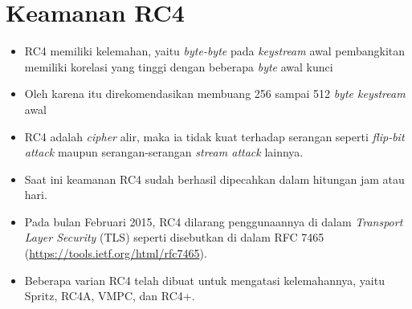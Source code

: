 \documentclass{article}
\begin{document}

\section*{Keamanan RC4}

\begin{itemize}
    \item RC4 memiliki kelemahan, yaitu \textit{byte-byte} pada \textit{keystream} awal pembangkitan memiliki korelasi yang tinggi dengan beberapa \textit{byte} awal kunci
    \item Oleh karena itu direkomendasikan membuang 256 sampai 512 \textit{byte keystream} awal
    \item RC4 adalah \textit{cipher} alir, maka ia tidak kuat terhadap serangan seperti \textit{flip-bit attack} maupun serangan-serangan \textit{stream attack} lainnya.
    \item Saat ini keamanan RC4 sudah berhasil dipecahkan dalam hitungan jam atau hari.
    \item Pada bulan Februari 2015, RC4 dilarang penggunaannya di dalam \textit{Transport Layer Security} (TLS) seperti disebutkan di dalam RFC 7465 (\url{https://tools.ietf.org/html/rfc7465}).
    \item Beberapa varian RC4 telah dibuat untuk mengatasi kelemahannya, yaitu Spritz, RC4A, VMPC, dan RC4+.
\end{itemize}
\end{document}
